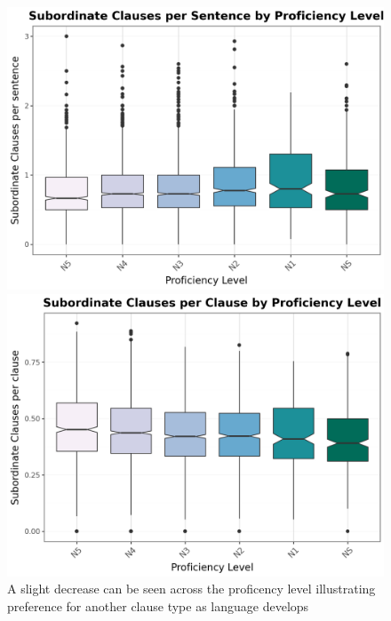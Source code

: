 

\begin{figure}[htbp]
    \centering
    \begin{minipage}{.48\textwidth}
        \centering
    \includegraphics[scale=.3]{img/SCperS}
    \caption[Average Subordinate Clauses to Sentences across JLPT levels]{}
        \label{fig:SubclperS}
    \end{minipage}
    \hfill
\begin{minipage}{.48\textwidth}
        \centering
        \includegraphics[scale=.3]{img/SCperC}
        \caption[Average Subordinate Clauses to Clauses ratio across JLPT levels.]{A slight decrease can be seen across the proficency level illustrating preference for another clause type as language develops}
\label{fig:SCperC}
\end{minipage}
    \end{figure}

